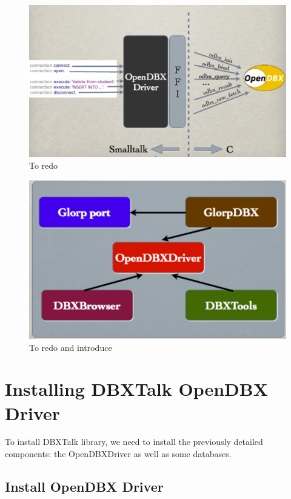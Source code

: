 \documentclass[a4paper,10pt,twoside]{book}
\begin{document}
\begin{figure}
\begin{center}
\includegraphics[width=\linewidth]{Architecture}
\caption{To redo}
\end{center}
\end{figure}

\begin{figure}
\begin{center}
\includegraphics[width=\linewidth]{Tools}
\caption{To redo and introduce}
\end{center}
\end{figure}


\section{Installing DBXTalk OpenDBX Driver}
To install DBXTalk library, we need to install the previously detailed components: the OpenDBXDriver as well as some databases.

\subsection*{Install OpenDBX Driver}
\end{document}
